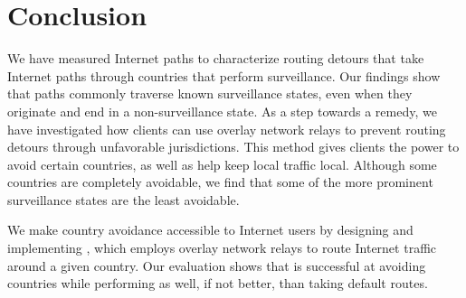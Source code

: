 \section{Conclusion}
\label{conclusion}

We have measured Internet paths to characterize routing
detours that take Internet paths through countries that perform
surveillance.  Our findings show that paths commonly traverse known
surveillance states, even when they originate and end in a
non-surveillance state.  As a step towards a remedy, we have
investigated how clients can use overlay network relays to prevent routing detours through
unfavorable jurisdictions.  This method gives clients the power to
avoid certain countries, as well as help keep local traffic local.
Although some countries are completely avoidable, we find that some of
the more prominent surveillance states are the least avoidable.

We make country avoidance accessible to Internet users by designing 
and implementing \system{}, which employs overlay network relays to 
route Internet traffic around a given country.  Our evaluation shows 
that \system{} is successful at avoiding countries while performing 
as well, if not better, than taking default routes.

